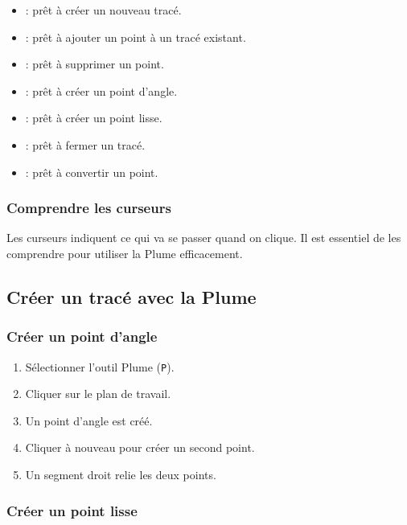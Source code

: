 \begin{itemize}
    \item {} : prêt à créer un nouveau tracé.
    \item {} : prêt à ajouter un point à un tracé existant.
    \item {} : prêt à supprimer un point.
    \item {} : prêt à créer un point d'angle.
    \item {} : prêt à créer un point lisse.
    \item {} : prêt à fermer un tracé.
    \item {} : prêt à convertir un point.
\end{itemize}

\subsubsection{Comprendre les curseurs}

Les curseurs indiquent ce qui va se passer quand on clique. Il est essentiel de les comprendre pour utiliser la Plume efficacement.

\subsection{Créer un tracé avec la Plume}

\subsubsection{Créer un point d'angle}

\begin{enumerate}
    \item Sélectionner l'outil Plume (\texttt{P}).
    \item Cliquer sur le plan de travail.
    \item Un point d'angle est créé.
    \item Cliquer à nouveau pour créer un second point.
    \item Un segment droit relie les deux points.
\end{enumerate}

\subsubsection{Créer un point lisse}

